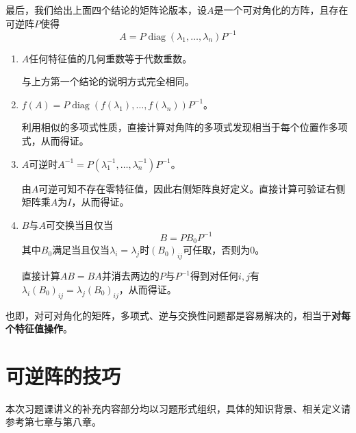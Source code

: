 \documentclass[a4paper,UTF8,fontset=windows]{ctexart}
\DeclareMathOperator{\diag}{diag}
\newcommand*{\note}{\noindent *}
\begin{document}
最后，我们给出上面四个结论的矩阵论版本，设$A$是一个可对角化的方阵，且存在可逆阵$P$使得
$$A=P\diag(\lambda_1,\dots,\lambda_n)P^{-1}$$
\begin{enumerate}
    \item $A$任何特征值的几何重数等于代数重数。
    
    与上方第一个结论的说明方式完全相同。
    
    \item $f(A)=P\diag(f(\lambda_1),\dots,f(\lambda_n))P^{-1}$。
    
    利用相似的多项式性质，直接计算对角阵的多项式发现相当于每个位置作多项式，从而得证。
    
    \item $A$可逆时$A^{-1}=P(\lambda_1^{-1},\dots,\lambda_n^{-1})P^{-1}$。
    
    由$A$可逆可知不存在零特征值，因此右侧矩阵良好定义。直接计算可验证右侧矩阵乘$A$为$I$，从而得证。
    
    \item $B$与$A$可交换当且仅当
    $$B=PB_0P^{-1}$$
    其中$B_0$满足当且仅当$\lambda_i=\lambda_j$时$(B_0)_{ij}$可任取，否则为0。

    直接计算$AB=BA$并消去两边的$P$与$P^{-1}$得到对任何$i,j$有$\lambda_i(B_0)_{ij}=\lambda_j(B_0)_{ij}$，从而得证。
\end{enumerate}

也即，对可对角化的矩阵，多项式、逆与交换性问题都是容易解决的，相当于\textbf{对每个特征值操作}。

\section{可逆阵的技巧}
\note 本次习题课讲义的补充内容部分均以习题形式组织，具体的知识背景、相关定义请参考第七章与第八章。
\end{document}
